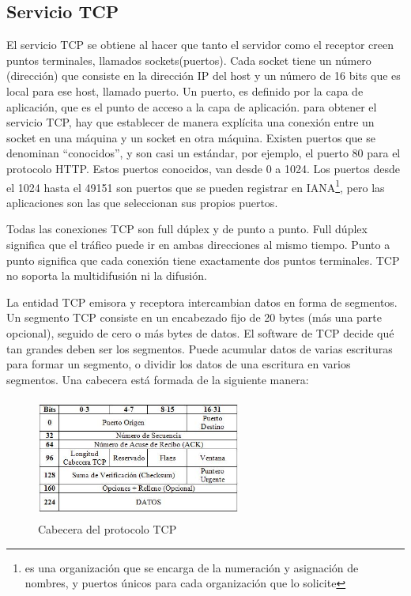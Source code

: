 \subsection{Servicio TCP}
	El servicio TCP se obtiene al hacer que tanto el servidor como el receptor creen puntos terminales, llamados sockets(puertos). Cada socket tiene un número (dirección) que consiste en la dirección IP del host y un número de 16 bits que es local para ese host, llamado puerto. Un puerto, es definido por la capa de aplicación, que es el punto de acceso a la capa de aplicación. para obtener el servicio TCP, hay que establecer de manera explícita una conexión entre un socket en una máquina y un socket en otra máquina. 
	Existen puertos que se denominan ``conocidos'', y son casi un estándar, por ejemplo, el puerto 80 para el protocolo HTTP. Estos puertos conocidos, van desde 0 a 1024. Los puertos desde el 1024 hasta el 49151 son puertos que se pueden registrar en IANA\footnote{es una organización que se encarga de la numeración y asignación de nombres, y puertos únicos para cada organización que lo solicite}, pero las aplicaciones son las que seleccionan sus propios puertos.  
	
	Todas las conexiones TCP son full dúplex y de punto a punto. Full dúplex significa que el tráfico puede ir en ambas direcciones al mismo tiempo. Punto a punto significa que cada conexión tiene exactamente dos puntos terminales. TCP no soporta la multidifusión ni la difusión. 
	
	La entidad TCP emisora y receptora intercambian datos en forma de segmentos. Un segmento TCP consiste en un encabezado fijo de 20 bytes (más una parte opcional), seguido de cero o más bytes de datos. El software de TCP decide qué tan grandes deben ser los segmentos. Puede acumular datos de varias escrituras para formar un segmento, o dividir los datos de una escritura en varios segmentos. Una cabecera está formada de la siguiente manera: 
	\begin{figure}[ht]
		\centering 
		\includegraphics[height=4cm,width=0.6\textwidth]{parte_2/redes/cabecera-tcp} 
		\caption{Cabecera del protocolo TCP}
	\end{figure}

